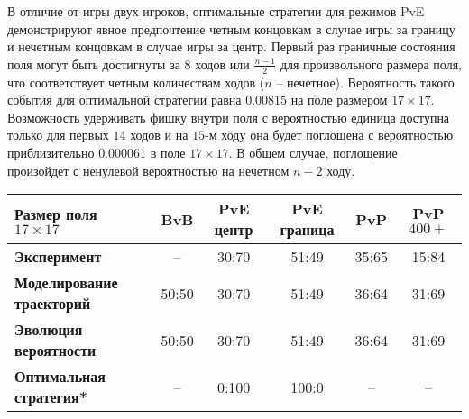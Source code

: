 В отличие от игры двух игроков, оптимальные стратегии для режимов PvE демонстрируют явное предпочтение четным концовкам в случае игры за границу и 
нечетным концовкам в случае игры за центр. Первый раз граничные состояния поля могут быть достигнуты за $8$ ходов или $\frac{n-1}{2}$ для произвольного размера поля, 
что соответствует четным количествам ходов ($n$ -- нечетное). Вероятность такого события для оптимальной стратегии равна $0.00815$ на поле размером $17 \times 17$. 
Возможность удерживать фишку внутри поля с вероятностью единица доступна только для первых $14$ ходов и на $15$-м ходу она будет поглощена с вероятностью 
приблизительно $0.000061$ в поле $17 \times 17$. В общем случае, поглощение произойдет с ненулевой вероятностью на нечетном $n-2$ ходу.

\begin{table}[]
    \fontsize{10pt}{10pt}\selectfont
    \begin{tabular}{|l|c|c|c|c|c|}%
        \toprule
        Размер поля $17 \times 17$ & \textbf{BvB} & \textbf{PvE центр} & \textbf{PvE граница} & \textbf{PvP} & \textbf{PvP $400+$} \\
        \midrule
        \textbf{Эксперимент} & --     & 30:70 & 51:49 & 35:65 & 15:84 \\
        \textbf{Моделирование траекторий} & 50:50 & 30:70 & 51:49 & 36:64 & 31:69 \\
        \textbf{Эволюция вероятности}  & 50:50 & 30:70 & 51:49 & 36:64 & 31:69 \\
        \textbf{Оптимальная стратегия*}    & --     & 0:100 & 100:0 & --   & --     \\

\end{tabular}
\end{table}
